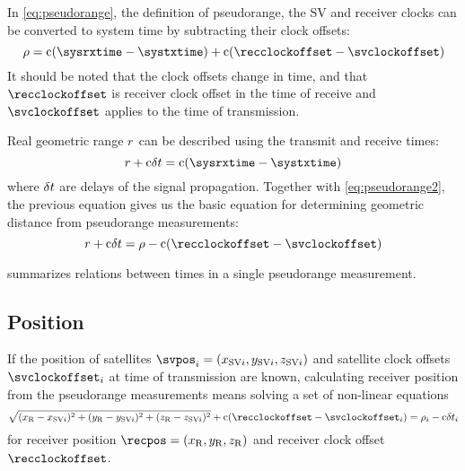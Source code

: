 In \eqref{eq:pseudorange}, the definition of pseudorange, the SV and receiver clocks can be
converted to system time by subtracting their clock offsets:
\begin{equation}
	\label{eq:pseudorange2}
	\rho = \speedoflight (\sysrxtime - \systxtime) + \speedoflight (\recclockoffset - \svclockoffset)
\end{equation}
It should be noted that the clock offsets change in time, and that \(\recclockoffset\) is receiver clock
offset in the time of receive and \(\svclockoffset\) applies to the time of transmission.

Real geometric range \(r\) can be described using the transmit and receive times:
\begin{equation}
	\geomrange + \speedoflight\geomrangedelays = \speedoflight (\sysrxtime - \systxtime)
\end{equation}
where \(\delta{t}\) are delays of the signal propagation.
Together with \eqref{eq:pseudorange2}, the previous equation gives us
the basic equation for determining geometric distance from pseudorange measurements:
\begin{equation}
	\geomrange + \speedoflight\geomrangedelays = \rho - \speedoflight (\recclockoffset - \svclockoffset)
\end{equation}


 summarizes relations between times in a single pseudorange measurement.

\subsection{Position}
\label{sec:gps-position}

If the position of satellites \(\svpos_i = \coord{x_{{\SV}i}}{y_{{\SV}i}}{z_{{\SV}i}}\) and satellite
clock offsets \(\svclockoffset_i\) at time of transmission are known,
calculating receiver position from the pseudorange measurements means solving a set of non-linear equations
\begin{equation}
	\label{eq:pseudorange3}
	\sqrt{(x_\REC - x_{{\SV}i})^2 + (y_\REC - y_{{\SV}i})^2 +(z_\REC - z_{{\SV}i})^2} +
	\speedoflight (\recclockoffset - \svclockoffset_i)
	=
	\rho_i - \speedoflight\geomrangedelays_i
\end{equation}
for receiver position \(\recpos = \coord{x_\REC}{y_\REC}{z_\REC}\) and receiver clock offset \(\recclockoffset\).

